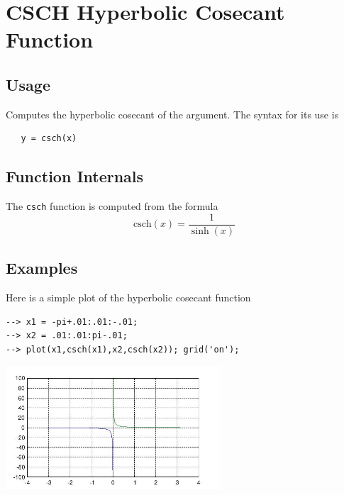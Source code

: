 \section{CSCH Hyperbolic Cosecant Function}

\subsection{Usage}

Computes the hyperbolic cosecant of the argument.
The syntax for its use is
\begin{verbatim}
   y = csch(x)
\end{verbatim}
\subsection{Function Internals}

The \verb|csch| function is computed from the formula
\[
   \mathrm{csch}(x) = \frac{1}{\sinh(x)}
\]
\subsection{Examples}

Here is a simple plot of the hyperbolic cosecant function
\begin{verbatim}
--> x1 = -pi+.01:.01:-.01;
--> x2 = .01:.01:pi-.01;
--> plot(x1,csch(x1),x2,csch(x2)); grid('on');
\end{verbatim}


\centerline{\includegraphics[width=8cm]{cschplot}}


